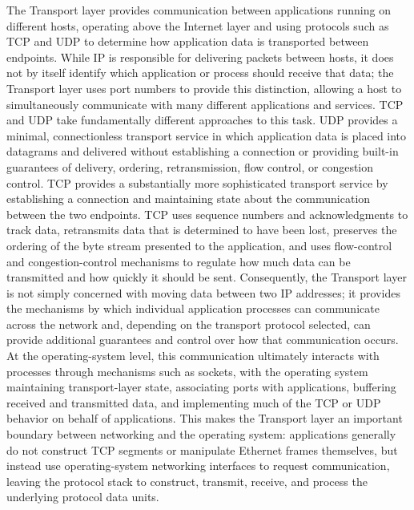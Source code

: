 \documentclass[12pt]{article}
\begin{document}
The Transport layer provides communication between applications running on different hosts, operating above the Internet layer and using protocols such as TCP and UDP to determine how application data is transported between endpoints. While IP is responsible for delivering packets between hosts, it does not by itself identify which application or process should receive that data; the Transport layer uses port numbers to provide this distinction, allowing a host to simultaneously communicate with many different applications and services. TCP and UDP take fundamentally different approaches to this task. UDP provides a minimal, connectionless transport service in which application data is placed into datagrams and delivered without establishing a connection or providing built-in guarantees of delivery, ordering, retransmission, flow control, or congestion control. TCP provides a substantially more sophisticated transport service by establishing a connection and maintaining state about the communication between the two endpoints. TCP uses sequence numbers and acknowledgments to track data, retransmits data that is determined to have been lost, preserves the ordering of the byte stream presented to the application, and uses flow-control and congestion-control mechanisms to regulate how much data can be transmitted and how quickly it should be sent. Consequently, the Transport layer is not simply concerned with moving data between two IP addresses; it provides the mechanisms by which individual application processes can communicate across the network and, depending on the transport protocol selected, can provide additional guarantees and control over how that communication occurs. At the operating-system level, this communication ultimately interacts with processes through mechanisms such as sockets, with the operating system maintaining transport-layer state, associating ports with applications, buffering received and transmitted data, and implementing much of the TCP or UDP behavior on behalf of applications. This makes the Transport layer an important boundary between networking and the operating system: applications generally do not construct TCP segments or manipulate Ethernet frames themselves, but instead use operating-system networking interfaces to request communication, leaving the protocol stack to construct, transmit, receive, and process the underlying protocol data units.
\end{document}
